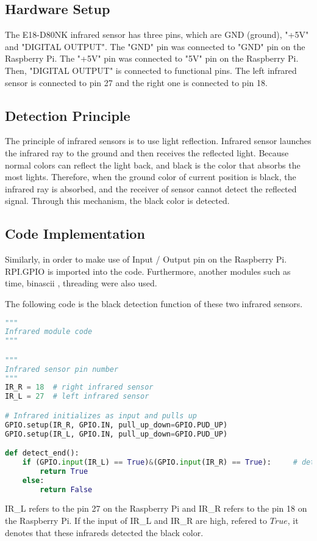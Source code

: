 \documentclass[11pt,times,oneside,openright,hardcopy]{eeereport}
\begin{document}
\subsection{Hardware Setup}
The E18-D80NK infrared sensor has three pins, which are GND (ground), "+5V" and "DIGITAL OUTPUT". The "GND" pin was connected to "GND" pin on the Raspberry Pi.
The "+5V" pin was connected to "5V" pin on the Raspberry Pi. Then, "DIGITAL OUTPUT" is connected to functional pins. The left infrared sensor is connected to pin 27
and the right one is connected to pin 18.

\subsection{Detection Principle}
The principle of infrared sensors is to use light reflection. Infrared sensor launches the infrared ray to the ground and then receives the reflected light.
Because normal colors can reflect the light back, and black is the color that absorbs the most lights. Therefore, when the ground color of current position is black,
the infrared ray is absorbed, and the receiver of sensor cannot detect the reflected signal. Through this mechanism, the black color is detected.

\subsection{Code Implementation}
Similarly, in order to make use of Input / Output pin on the Raspberry Pi. RPI.GPIO is imported into the code.
Furthermore, another modules such as time, binascii \cite{Lundh:2001vk}, threading were also used.

The following code is the black detection function of these two infrared sensors. 
\begin{lstlisting}[language=Python]
"""
Infrared module code
"""

"""
Infrared sensor pin number
"""
IR_R = 18  # right infrared sensor
IR_L = 27  # left infrared sensor

# Infrared initializes as input and pulls up
GPIO.setup(IR_R, GPIO.IN, pull_up_down=GPIO.PUD_UP)
GPIO.setup(IR_L, GPIO.IN, pull_up_down=GPIO.PUD_UP)

def detect_end():
    if (GPIO.input(IR_L) == True)&(GPIO.input(IR_R) == True):     # detect black on both sides.
        return True
    else:
        return False    
\end{lstlisting}
IR\_L refers to the pin 27 on the Raspberry Pi and IR\_R refers to the pin 18 on the Raspberry Pi.
If the input of IR\_L and IR\_R are high, refered to $True$, it denotes that these infrareds detected the black color.
\end{document}
